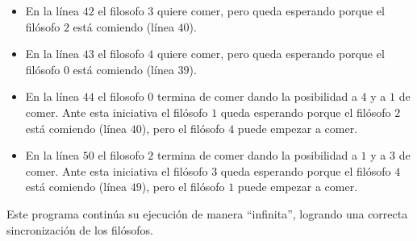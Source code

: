 \begin{itemize}
    \item En la línea $42$ el filosofo $3$ quiere comer, pero queda esperando porque el filósofo $2$ está comiendo (línea $40$).
    \item En la línea $43$ el filosofo $4$ quiere comer, pero queda esperando porque el filósofo $0$ está comiendo (línea $39$).
    \item En la línea $44$ el filosofo $0$ termina de comer dando la posibilidad a $4$ y a $1$ de comer.
    Ante esta iniciativa el filósofo $1$ queda esperando porque el filósofo $2$ está comiendo (línea $40$), pero el filósofo $4$ puede empezar a comer.
    \item En la línea $50$ el filosofo $2$ termina de comer dando la posibilidad a $1$ y a $3$ de comer.
    Ante esta iniciativa el filósofo $3$ queda esperando porque el filósofo $4$ está comiendo (línea $49$), pero el filósofo $1$ puede empezar a comer.
\end{itemize}
Este programa continúa su ejecución de manera ``infinita'', logrando una correcta sincronización de los filósofos.